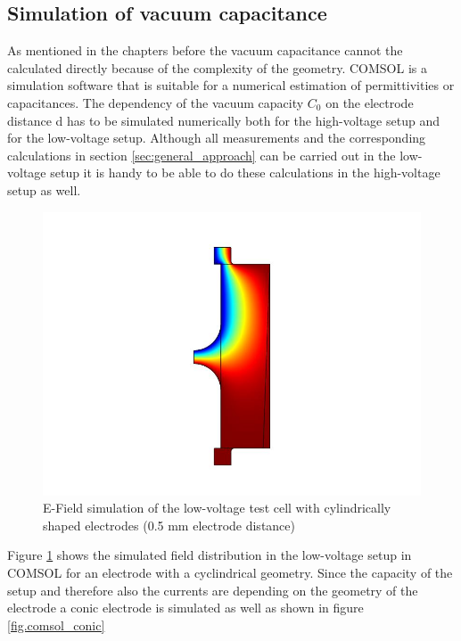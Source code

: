 \subsection{Simulation of vacuum capacitance} 
\label{sec.sim_vac_comsol}
As mentioned in the chapters before the vacuum capacitance cannot the calculated directly because of the complexity of the geometry. COMSOL is a simulation software that is suitable for a numerical estimation of permittivities or capacitances. The dependency of the vacuum capacity $C_0$ on the electrode distance d has to be simulated numerically both for the high-voltage setup and for the low-voltage setup. Although all measurements and the corresponding calculations in section \ref{sec:general_approach} can be carried out in the low-voltage setup it is handy to be able to do these calculations in the high-voltage setup as well. 


\begin{figure}[htbp]
	\centering
	\includegraphics{figures/COMSOL_Beispielbild.jpg}		
	\caption[Kurze Abbildungsbeschreibung]{E-Field simulation of the low-voltage test cell with cylindrically shaped electrodes (0.5 mm electrode distance)} \label{fig.comsol_beispiel}

\end{figure}
 
Figure \ref{fig.comsol_beispiel} shows the simulated field distribution in the low-voltage setup in COMSOL for an electrode with a cyclindrical geometry. Since the capacity of the setup and therefore also the currents are depending on the geometry of the electrode a conic electrode is simulated as well as shown in figure  \ref{fig.comsol_conic}

